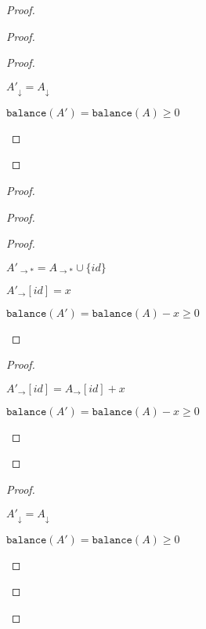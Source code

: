\documentclass[9pt, oneside]{article}   	%
\begin{document}
\begin{proof}
\begin{proof}
		\begin{proof}
			\begin{pfenum}
				\item $A'_\downarrow = A_\downarrow$
				\item $\texttt{balance}(A') = \texttt{balance}(A) \geq 0$
			\end{pfenum}
		\end{proof}		
	\end{proof}
	
	\begin{proof}
		\begin{proof}
			\begin{proof}
				\begin{pfenum}
					\item $A'_{\rightarrow *} = A_{\rightarrow *} \cup \{ \textit{id} \}$
					\item $A'_\rightarrow [\textit{id}] = x$
					\item $\texttt{balance}(A') = \texttt{balance}(A) - x \geq 0$
				\end{pfenum}
			\end{proof}
			
			\begin{proof}
				\begin{pfenum}
					\item $A'_\rightarrow [\textit{id}] = A_\rightarrow [\textit{id}] + x$
					\item $\texttt{balance}(A') = \texttt{balance}(A) - x \geq 0$
				\end{pfenum}
			\end{proof}
		\end{proof}
		
		\begin{proof}
			\begin{pfenum}
				\item $A'_\downarrow = A_\downarrow$
				\item $\texttt{balance}(A') = \texttt{balance}(A) \geq 0$
			\end{pfenum}
		\end{proof}		
	\end{proof}
	

\end{proof}
\end{document}
